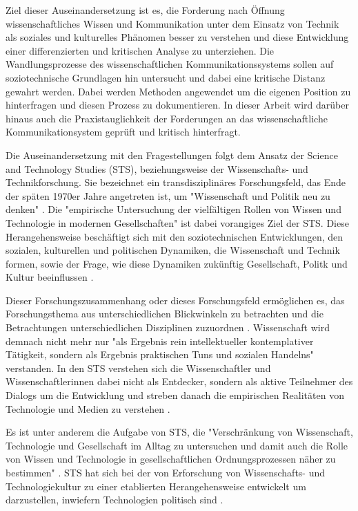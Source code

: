 Ziel dieser Auseinandersetzung ist es, die Forderung nach Öffnung wissenschaftliches Wissen und Kommunikation unter dem Einsatz von Technik als soziales und kulturelles Phänomen besser zu verstehen und diese Entwicklung einer differenzierten und kritischen Analyse zu unterziehen. Die Wandlungsprozesse des wissenschaftlichen Kommunikationssystems sollen auf soziotechnische Grundlagen hin untersucht und dabei eine kritische Distanz gewahrt werden. Dabei werden Methoden angewendet um die eigenen Position zu hinterfragen und diesen Prozess zu dokumentieren. In dieser Arbeit wird darüber hinaus auch die Praxistauglichkeit der Forderungen an das wissenschaftliche Kommunikationsystem geprüft und kritisch hinterfragt.

Die Auseinandersetzung mit den Fragestellungen folgt dem Ansatz der Science and Technology Studies (STS), beziehungsweise der Wissenschafts- und Technikforschung. Sie bezeichnet ein transdisziplinäres Forschungsfeld, das Ende der späten 1970er Jahre angetreten ist, um "Wissenschaft und Politik neu zu denken" \cite{Potthast_2010}. Die "empirische Untersuchung der vielfältigen Rollen von Wissen und Technologie in modernen Gesellschaften" \cite{beck_2014_science} ist dabei vorangiges Ziel der STS. Diese Herangehensweise beschäftigt sich mit den soziotechnischen Entwicklungen, den sozialen, kulturellen und politischen Dynamiken, die Wissenschaft und Technik formen, sowie der Frage, wie diese Dynamiken zukünftig Gesellschaft, Politk und Kultur beeinflussen \cite{Potthast_2010}.

Dieser Forschungszusammenhang oder dieses Forschungsfeld ermöglichen es, das Forschungsthema aus unterschiedlichen Blickwinkeln zu betrachten und die Betrachtungen unterschiedlichen Disziplinen zuzuordnen \cite{beck_2014_science}  \cite{Potthast_2010}. Wissenschaft wird demnach nicht mehr nur "als Ergebnis rein intellektueller kontemplativer Tätigkeit, sondern als Ergebnis praktischen Tuns und sozialen Handelns" \cite{beck_2014_science} verstanden. In den STS verstehen sich die Wissenschaftler und Wissenschaftlerinnen dabei nicht als Entdecker, sondern als aktive Teilnehmer des Dialogs um die Entwicklung \cite{MacKenzie_STS_1999} und streben danach die empirischen Realitäten von Technologie und Medien zu verstehen \cite{kelty_2014_freedom}.

Es ist unter anderem die Aufgabe von STS, die "Verschränkung von Wissenschaft, Technologie und Gesellschaft im Alltag zu untersuchen und damit auch die Rolle von Wissen und Technologie in gesellschaftlichen Ordnungsprozessen näher zu bestimmen" \cite{beck_2014_science}. STS hat sich bei der von Erforschung von Wissenschafts- und Technologiekultur zu einer etablierten Herangehensweise entwickelt um darzustellen, inwiefern Technologien politisch sind \cite{kelty_2014_freedom}.

